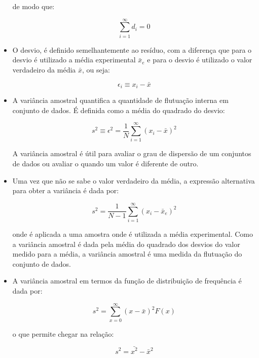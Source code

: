 \documentclass[11pt,a4paper]{article}
\begin{document}
\begin{itemize}
				de modo que:

					\begin{equation}
						\sum_{i = 1}^{\infty} d_i = 0
					\end{equation}

			\item O desvio, é definido semelhantemente ao resíduo, com a diferença que para o desvio é utilizado a média experimental $\bar{x}_e$ e para o desvio é utilizado o valor verdadeiro da média $\bar{x}$, ou seja:
				
					\begin{equation}
						\epsilon_i \equiv x_i - \bar{x}
					\end{equation}


			\item A variância amostral quantifica a quantidade de flutuação interna em conjunto de dados. É definida como a média do quadrado do desvio:
				
					\begin{equation}
						s^2 \equiv \epsilon^2 = \frac{1}{N} \sum_{i = 1}^{\infty} (x_i - \bar{x})^2
					\end{equation}

				A variância amostral é útil para avaliar o grau de dispersão de um conjuntos de dados ou avaliar o quando um valor é diferente de outro. 

			\item Uma vez que não se sabe o valor verdadeiro da média, a expressão alternativa para obter a variância é dada por:
				
					\begin{equation}
						s^2 = \frac{1}{N - 1} \sum_{i = 1}^{\infty} (x_i - \bar{x}_e)^2
					\end{equation}

				onde é aplicada a uma amostra onde é utilizada a média experimental. Como a variância amostral é dada pela média do quadrado dos desvios do valor medido para a média, a variância amostral é uma medida da flutuação do conjunto de dados. 
				
			\item A variância amostral em termos da função de distribuição de frequência é dada por:
				
					\begin{equation}
						s^2 = \sum_{x = 0}^{\infty} (x - \bar{x})^2 F(x)
					\end{equation}

				o que permite chegar na relação:

					\begin{equation}
						s^2 = \bar{x^2} - \bar{x}^2
					\end{equation}
        \end{itemize}
\end{document}
